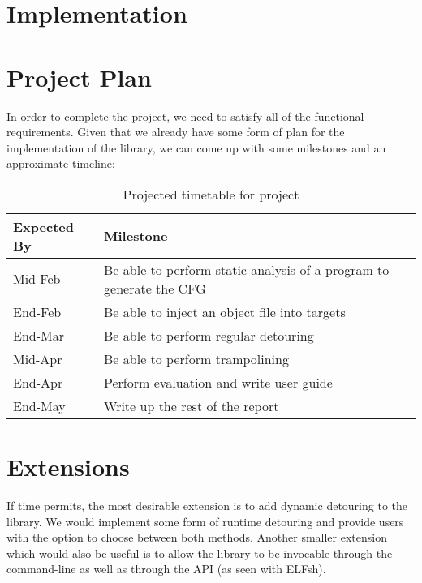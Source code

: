 \chapter{Implementation}\label{chap:Implementation}

\chapter{Project Plan}

In order to complete the project, we need to satisfy all of the functional requirements. Given that we already have some form of plan for the implementation of the library, we can come up with some milestones and an approximate timeline:

\begin{table}[H]
 \caption{Projected timetable for project}
 \begin{tabular}{l p{12cm} }
 \hline
 Expected By & Milestone \\
 \hline
 Mid-Feb & Be able to perform static analysis of a program to generate the CFG \\
 End-Feb & Be able to inject an object file into targets \\
 End-Mar & Be able to perform regular detouring \\
 Mid-Apr & Be able to perform trampolining \\
 End-Apr & Perform evaluation and write user guide\\
 End-May & Write up the rest of the report \\
 \hline
 \end{tabular}
\end{table}

\chapter{Extensions}

If time permits, the most desirable extension is to add dynamic detouring to the library. We would implement some form of runtime detouring and provide users with the option to choose between both methods. Another smaller extension which would also be useful is to allow the library to be invocable through the command-line as well as through the API (as seen with ELFsh).

